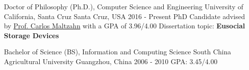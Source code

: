 

\begin{cventries}

  \cventry
    {Doctor of Philosophy (Ph.D.), Computer Science and Engineering} %
    {University of California, Santa Cruz} %
    {Santa Cruz, USA} %
    {2016 - Present} %
    {
        PhD Candidate advised by \href{https://users.soe.ucsc.edu/~carlosm/dev/}{Prof. Carlos Maltzahn} with a GPA of 3.96/4.00 \newline
        Dissertation topic: \textbf{Eusocial Storage Devices}
    }

  \cventry
    {Bachelor of Science (BS), Information and Computing Science}
    {South China Agricultural University}
    {Guangzhou, China}
    {2006 - 2010}
    {GPA: 3.45/4.00}

\end{cventries}
